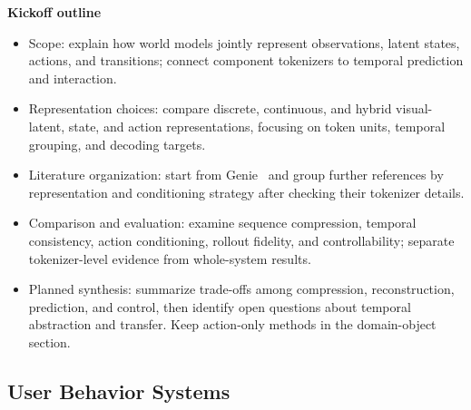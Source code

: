 \textbf{Kickoff outline}
\begin{itemize}
    \item Scope: explain how world models jointly represent observations, latent states, actions, and transitions; connect component tokenizers to temporal prediction and interaction.
    \item Representation choices: compare discrete, continuous, and hybrid visual-latent, state, and action representations, focusing on token units, temporal grouping, and decoding targets.
    \item Literature organization: start from Genie~\citep{bruce2024genie} and group further references by representation and conditioning strategy after checking their tokenizer details.
    \item Comparison and evaluation: examine sequence compression, temporal consistency, action conditioning, rollout fidelity, and controllability; separate tokenizer-level evidence from whole-system results.
    \item Planned synthesis: summarize trade-offs among compression, reconstruction, prediction, and control, then identify open questions about temporal abstraction and transfer. Keep action-only methods in the domain-object section.
\end{itemize}


\subsection{User Behavior Systems}

